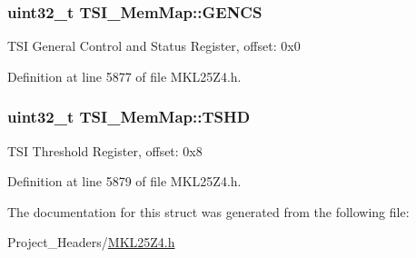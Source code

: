 \subsubsection[{\texorpdfstring{G\+E\+N\+CS}{GENCS}}]{\setlength{\rightskip}{0pt plus 5cm}uint32\+\_\+t T\+S\+I\+\_\+\+Mem\+Map\+::\+G\+E\+N\+CS}\hypertarget{struct_t_s_i___mem_map_a14380d508e161af3b794962e7c3f8abb}{}\label{struct_t_s_i___mem_map_a14380d508e161af3b794962e7c3f8abb}
T\+SI General Control and Status Register, offset\+: 0x0 

Definition at line 5877 of file M\+K\+L25\+Z4.\+h.

\subsubsection[{\texorpdfstring{T\+S\+HD}{TSHD}}]{\setlength{\rightskip}{0pt plus 5cm}uint32\+\_\+t T\+S\+I\+\_\+\+Mem\+Map\+::\+T\+S\+HD}\hypertarget{struct_t_s_i___mem_map_aeede6a8023aabcd9c6fff71419ae4cce}{}\label{struct_t_s_i___mem_map_aeede6a8023aabcd9c6fff71419ae4cce}
T\+SI Threshold Register, offset\+: 0x8 

Definition at line 5879 of file M\+K\+L25\+Z4.\+h.



The documentation for this struct was generated from the following file\+:\begin{DoxyCompactItemize}
\item 
Project\+\_\+\+Headers/\hyperlink{_m_k_l25_z4_8h}{M\+K\+L25\+Z4.\+h}\end{DoxyCompactItemize}
